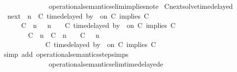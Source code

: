 \begin{isabellebody}
\ \ \ \ \ \ \ \ \ \ \ \ \ \ operational{\isacharunderscore}semantics{\isacharunderscore}elim{\isachardot}implies{\isacharunderscore}not{\isacharunderscore}e{}{\isacharparenright}%
\endisatagproof
{\isafoldproof}%
%
\isadelimproof
\isanewline
%
\endisadelimproof
\isanewline
{}\isamarkupfalse%
\ Cnext{\isacharunderscore}solve{\isacharunderscore}timedelayed{\isacharcolon}\isanewline
\ \ {\isacartoucheopen}{\isacharparenleft}{\isasymC}\isactrlsub n\isactrlsub e\isactrlsub x\isactrlsub t\ {\isacharparenleft}{\isasymGamma}{\isacharcomma}\ n\ {\isasymturnstile}\ {\isacharparenleft}{\isacharparenleft}C\ time{\isacharminus}delayed\ by\ {\isasymdelta}{\isasymtau}\ on\ C\ implies\ C\ {\isacharhash}\ {\isasymPsi}{\isacharparenright}\ {\isasymtriangleright}\ {\isasymPhi}{\isacharparenright}{\isacharparenright}\isanewline
\ \ \ \ {\isasymsupseteq}\ {\isacharbraceleft}\ {\isacharparenleft}{\isacharparenleft}C\ {\isasymnot}{\isasymUp}\ n{\isacharparenright}\ {\isacharhash}\ {\isasymGamma}{\isacharparenright}{\isacharcomma}\ n\ {\isasymturnstile}\ {\isasymPsi}\ {\isasymtriangleright}\ {\isacharparenleft}{\isacharparenleft}C\ time{\isacharminus}delayed\ by\ {\isasymdelta}{\isasymtau}\ on\ C\ implies\ C\ {\isacharhash}\ {\isasymPhi}{\isacharparenright}{\isacharcomma}\isanewline
\ \ \ \ \ \ \ \ {\isacharparenleft}{\isacharparenleft}C\ {\isasymUp}\ n{\isacharparenright}\ {\isacharhash}\ {\isacharparenleft}C\ {\isacharat}\ n\ {\isasymoplus}\ {\isasymdelta}{\isasymtau}\ {\isasymRightarrow}\ C\ {\isacharhash}\ {\isasymGamma}{\isacharparenright}{\isacharcomma}\ n\isanewline
\ \ \ \ \ \ \ \ \ \ {\isasymturnstile}\ {\isasymPsi}\ {\isasymtriangleright}\ {\isacharparenleft}{\isacharparenleft}C\ time{\isacharminus}delayed\ by\ {\isasymdelta}{\isasymtau}\ on\ C\ implies\ C\ {\isacharhash}\ {\isasymPhi}{\isacharparenright}\ {\isacharbraceright}{\isacartoucheclose}\isanewline
%
\isadelimproof
%
\endisadelimproof
%
\isatagproof
{}\isamarkupfalse%
\ {\isacharparenleft}simp\ add{\isacharcolon}\ operational{\isacharunderscore}semantics{\isacharunderscore}step{\isachardot}simps\isanewline
\ \ \ \ \ \ \ \ \ \ \ \ \ \ operational{\isacharunderscore}semantics{\isacharunderscore}elim{\isachardot}timedelayed{\isacharunderscore}e{}\isanewline

\end{isabellebody}
